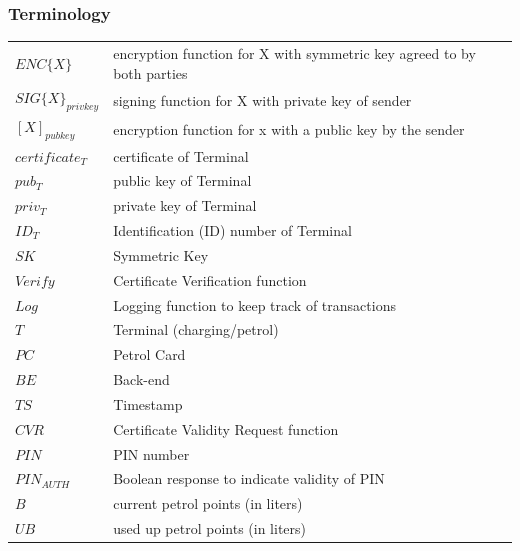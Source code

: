 \subsubsection{Terminology}
    \begin{tabular}{*{2}{l}}
        $ENC\{X\}$ & encryption function for X with symmetric key agreed to by both parties\\
        $SIG\{X\}_{privkey}$ & signing function for X with private key of sender \\
        $[X]_{pubkey}$ & encryption function for x with a public key by the sender \\
        $certificate_{T}$ & certificate of Terminal \\
        $pub_{T}$ & public key of Terminal \\
        $priv_{T}$ & private key of Terminal  \\
        $ID_{T}$ & Identification (ID) number of Terminal \\
        $SK$ & Symmetric Key \\
        $Verify$ & Certificate Verification function \\
        $Log$ & Logging function to keep track of transactions \\
        $T$ & Terminal (charging/petrol) \\
        $PC$ & Petrol Card \\
        $BE$ & Back-end \\
        $TS$ & Timestamp \\
        $CVR$ & Certificate Validity Request function \\
        $PIN$ & PIN number \\
        $PIN_{AUTH}$ & Boolean response to indicate validity of PIN \\
        $B$ & current petrol points (in liters) \\
        $UB$ & used up petrol points (in liters) \\
	\end{tabular}

